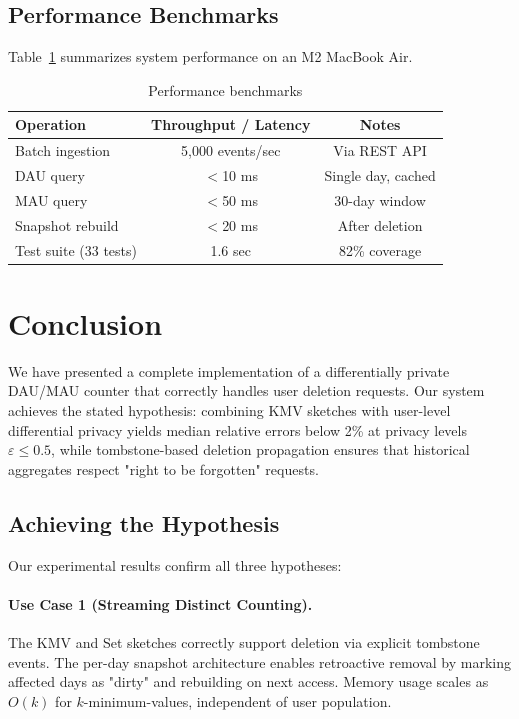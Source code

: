 \documentclass[11pt]{article}
\begin{document}
\subsection{Performance Benchmarks}

Table~\ref{tab:perf} summarizes system performance on an M2 MacBook Air.

\begin{table}[H]
\centering
\caption{Performance benchmarks}
\label{tab:perf}
\begin{tabular}{@{}lcc@{}}
\toprule
\textbf{Operation} & \textbf{Throughput / Latency} & \textbf{Notes} \\
\midrule
Batch ingestion & 5,000 events/sec & Via REST API \\
DAU query & $<$10 ms & Single day, cached \\
MAU query & $<$50 ms & 30-day window \\
Snapshot rebuild & $<$20 ms & After deletion \\
Test suite (33 tests) & 1.6 sec & 82\% coverage \\
\bottomrule
\end{tabular}
\end{table}


\newpage
\section{Conclusion}

We have presented a complete implementation of a differentially private DAU/MAU counter that correctly handles user deletion requests. Our system achieves the stated hypothesis: combining KMV sketches with user-level differential privacy yields median relative errors below 2\% at privacy levels $\varepsilon \le 0.5$, while tombstone-based deletion propagation ensures that historical aggregates respect "right to be forgotten" requests.

\subsection{Achieving the Hypothesis}

Our experimental results confirm all three hypotheses:

\paragraph{Use Case 1 (Streaming Distinct Counting).} The KMV and Set sketches correctly support deletion via explicit tombstone events. The per-day snapshot architecture enables retroactive removal by marking affected days as "dirty" and rebuilding on next access. Memory usage scales as $O(k)$ for $k$-minimum-values, independent of user population.
\end{document}
